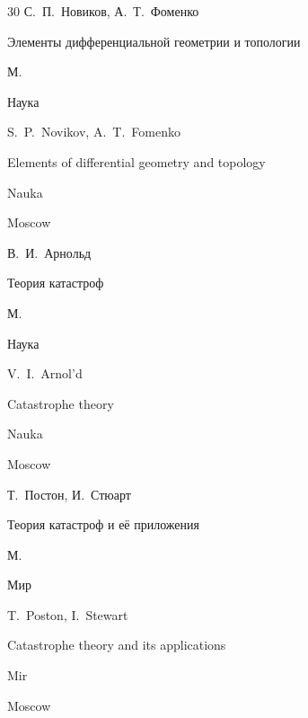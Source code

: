 {\begin{thebibliography}{30}
\by С.~П.~Новиков, А.~Т.~Фоменко

\book Элементы дифференциальной геометрии и топологии

\publaddr М.

\publ Наука



\misctransl

\by S.~P.~Novikov, A.~T.~Fomenko

\book Elements of differential geometry and topology

\publ Nauka

\publaddr Moscow






\by В.~И.~Арнольд

\book Теория катастроф

\publaddr М.

\publ Наука



\misctransl

\by V.~I.~Arnol'd

\book Catastrophe theory

\publ Nauka

\publaddr Moscow






\by Т.~Постон, И.~Стюарт

\book Теория катастроф и её приложения

\publaddr М.

\publ Мир



\misctransl

\by T.~Poston, I.~Stewart

\book Catastrophe theory and its applications

\publ Mir

\publaddr Moscow








\end{thebibliography}}
